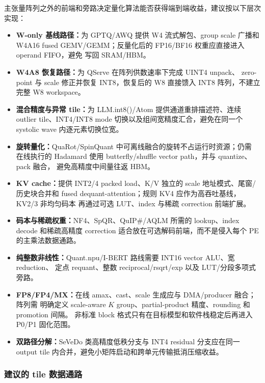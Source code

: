 主张量阵列之外的前端和旁路决定量化算法能否获得端到端收益，建议按以下层次实现：
\begin{itemize}
  \item \textbf{W-only 基线路径：}为 GPTQ/AWQ 提供 W4 流式解包、group scale 广播和
  W4A16 fused GEMV/GEMM；反量化后的 FP16/BF16 权重应直接进入 operand FIFO，避免
  写回 SRAM/HBM。
  \item \textbf{W4A8 恢复路径：}为 QServe 在阵列供数速率下完成 UINT4 unpack、
  zero-point 与 scale 修正并恢复 INT8，恢复后的 W8 直接馈入 INT8 阵列，不建立完整
  W8 workspace。
  \item \textbf{混合精度与异常 tile：}为 LLM.int8()/Atom 提供通道重排描述符、连续
  outlier tile、INT4/INT8 mode 切换以及组间宽精度汇合，避免在同一个 systolic wave
  内逐元素切换位宽。
  \item \textbf{旋转量化：}QuaRot/SpinQuant 中可离线融合的旋转不占运行时资源；仍需
  在线执行的 Hadamard 使用 butterfly/shuffle vector path，并与 quantize、pack 融合，
  避免高精度中间量往返 HBM。
  \item \textbf{KV cache：}提供 INT2/4 packed load、K/V 独立的 scale 地址模式、尾窗/
  历史块合并和 fused dequant-attention；规则 KV4 应作为高吞吐基线，KV2/3 非均匀码本
  再通过可选 LUT、index 与稀疏 correction 前端扩展。
  \item \textbf{码本与稀疏权重：}NF4、SpQR、QuIP\#/AQLM 所需的 lookup、index decode
  和稀疏高精度 correction 适合放在可选解码前端，而不是侵入每个 PE 的主乘法数据通路。
  \item \textbf{纯整数非线性：}Quant.npu/I-BERT 路线需要 INT16 vector ALU、宽 reduction、
  定点 requant、整数 reciprocal/rsqrt/exp 以及 LUT/分段多项式旁路。
  \item \textbf{FP8/FP4/MX：}在线 amax、cast、scale 生成应与 DMA/producer 融合；阵列需
  明确定义 scale-aware $K$ group、partial-product 精度、rounding 和 promotion 间隔。
  非标准 block 格式只有在目标模型和软件栈稳定后再进入 P0/P1 固化范围。
  \item \textbf{双路径分解：}SeVeDo 类高精度低秩分支与 INT4 residual 分支应在同一
  output tile 内合并，避免小矩阵启动和跨单元传输抵消压缩收益。
\end{itemize}

\subsubsection{建议的 tile 数据通路}

